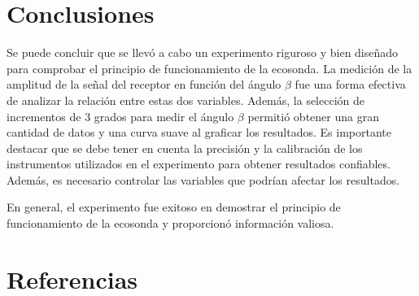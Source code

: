 \documentclass[spanish,notitlepage,letterpaper, 12pt]{article}
\begin{document}
\section{Conclusiones}
Se puede concluir que se llevó a cabo un experimento riguroso y bien diseñado para comprobar el principio de funcionamiento de la ecosonda. La medición de la amplitud de la señal del receptor en función del ángulo $\beta$ fue una forma efectiva de analizar la relación entre estas dos variables.
Además, la selección de incrementos de $3$ grados para medir el ángulo $\beta$ permitió obtener una gran cantidad de datos y una curva suave al graficar los resultados.
Es importante destacar que se debe tener en cuenta la precisión y la calibración de los instrumentos utilizados en el experimento para obtener resultados confiables. Además, es necesario controlar las variables que podrían afectar los resultados.\par 
\bigskip
En general, el experimento fue exitoso en demostrar el principio de funcionamiento de la ecosonda y proporcionó información valiosa.
\section{Referencias} 


\end{document}

